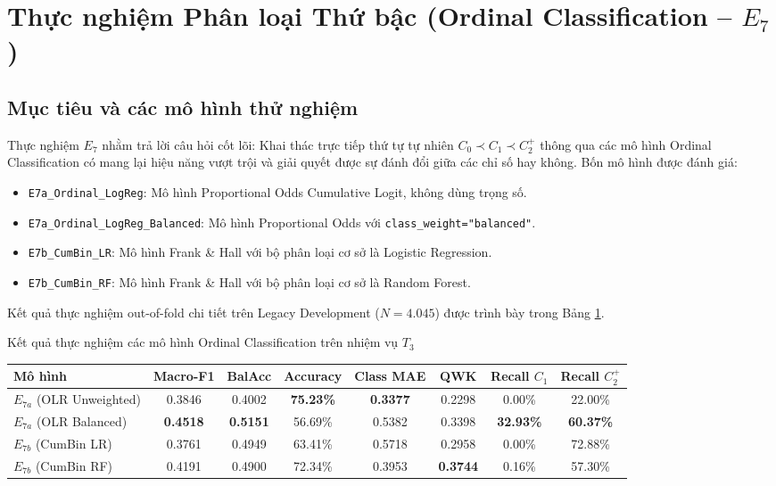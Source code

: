 \section{Thực nghiệm Phân loại Thứ bậc (Ordinal Classification -- $E_7$)}
\label{sec:thuc-nghiem-ordinal}

\subsection{Mục tiêu và các mô hình thử nghiệm}
Thực nghiệm $E_7$ nhằm trả lời câu hỏi cốt lõi: Khai thác trực tiếp thứ tự tự nhiên $C_0 \prec C_1 \prec C_2^+$ thông qua các mô hình Ordinal Classification có mang lại hiệu năng vượt trội và giải quyết được sự đánh đổi giữa các chỉ số hay không. Bốn mô hình được đánh giá:
\begin{itemize}
    \item \texttt{E7a\_Ordinal\_LogReg}: Mô hình Proportional Odds Cumulative Logit, không dùng trọng số.
    \item \texttt{E7a\_Ordinal\_LogReg\_Balanced}: Mô hình Proportional Odds với \texttt{class\_weight="balanced"}.
    \item \texttt{E7b\_CumBin\_LR}: Mô hình Frank \& Hall với bộ phân loại cơ sở là Logistic Regression.
    \item \texttt{E7b\_CumBin\_RF}: Mô hình Frank \& Hall với bộ phân loại cơ sở là Random Forest.
\end{itemize}

Kết quả thực nghiệm out-of-fold chi tiết trên Legacy Development ($N = 4.045$) được trình bày trong Bảng \ref{tab:ordinal-results}.

\begin{table}{Kết quả thực nghiệm các mô hình Ordinal Classification trên nhiệm vụ $T_3$}
\centering
\label{tab:ordinal-results}
\begin{tabular}{l c c c c c c c}
\toprule
\textbf{Mô hình} & \textbf{Macro-F1} & \textbf{BalAcc} & \textbf{Accuracy} & \textbf{Class MAE} & \textbf{QWK} & \textbf{Recall $C_1$} & \textbf{Recall $C_2^+$} \\
\midrule
$E_{7a}$ (OLR Unweighted) & 0.3846 & 0.4002 & \textbf{75.23\%} & \textbf{0.3377} & 0.2298 & 0.00\% & 22.00\% \\
$E_{7a}$ (OLR Balanced)   & \textbf{0.4518} & \textbf{0.5151} & 56.69\% & 0.5382 & 0.3398 & \textbf{32.93\%} & \textbf{60.37\%} \\
$E_{7b}$ (CumBin LR)      & 0.3761 & 0.4949 & 63.41\% & 0.5718 & 0.2958 & 0.00\% & 72.88\% \\
$E_{7b}$ (CumBin RF)      & 0.4191 & 0.4900 & 72.34\% & 0.3953 & \textbf{0.3744} & 0.16\% & 57.30\% \\
\bottomrule
\end{tabular}
\end{table}

